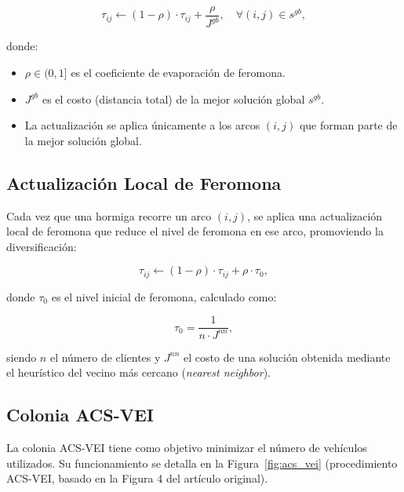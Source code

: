 \documentclass[12pt, letterpaper]{article}
\begin{document}
\begin{equation}
  \label{eq:global_update}
  \tau_{ij} \leftarrow (1 - \rho) \cdot \tau_{ij} + \frac{\rho}{J^{gb}},
  \quad \forall (i, j) \in s^{gb},
\end{equation}

\noindent donde:
\begin{itemize}[leftmargin=2cm]
  \item $\rho \in (0, 1]$ es el coeficiente de evaporación de feromona.
  \item $J^{gb}$ es el costo (distancia total) de la mejor solución global $s^{gb}$.
  \item La actualización se aplica únicamente a los arcos $(i, j)$ que forman parte de la mejor solución global.
\end{itemize}

\subsection{Actualización Local de Feromona}
\label{subsec:actualizacion_local}

Cada vez que una hormiga recorre un arco $(i, j)$, se aplica una actualización local de feromona que reduce el nivel de feromona en ese arco, promoviendo la diversificación:

\begin{equation}
  \label{eq:local_update}
  \tau_{ij} \leftarrow (1 - \rho) \cdot \tau_{ij} + \rho \cdot \tau_0,
\end{equation}

\noindent donde $\tau_0$ es el nivel inicial de feromona, calculado como:

\begin{equation}
  \label{eq:tau_0}
  \tau_0 = \frac{1}{n \cdot J^{nn}},
\end{equation}

\noindent siendo $n$ el número de clientes y $J^{nn}$ el costo de una solución obtenida mediante el heurístico del vecino más cercano (\textit{nearest neighbor}).

\subsection{Colonia ACS-VEI}
\label{subsec:acs_vei}

La colonia ACS-VEI tiene como objetivo minimizar el número de vehículos utilizados. Su funcionamiento se detalla en la Figura~\ref{fig:acs_vei} (procedimiento ACS-VEI, basado en la Figura 4 del artículo original).
\end{document}
